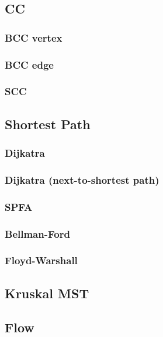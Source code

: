 \documentclass[10pt,oneside]{article}
\begin{document}
\begin{landscape}
\begin{multicols}{2}
\subsection{CC}

\subsubsection{BCC vertex}

\subsubsection{BCC edge}

\subsubsection{SCC}

\subsection{Shortest Path}

\subsubsection{Dijkatra}

\subsubsection{Dijkatra (next-to-shortest path)}

\subsubsection{SPFA}

\subsubsection{Bellman-Ford}

\subsubsection{Floyd-Warshall}

\subsection{Kruskal MST}

\subsection{Flow}


\end{multicols}
\end{landscape}
\end{document}
